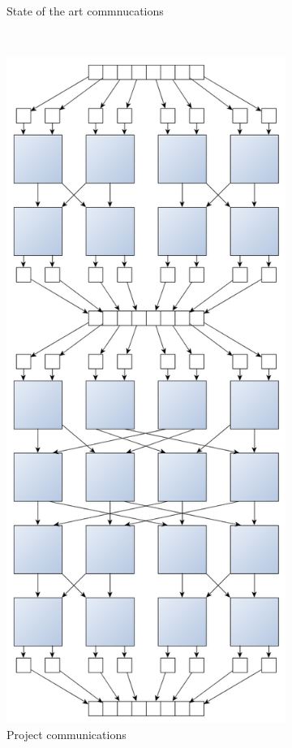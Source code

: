 \documentclass[a4paper,11pt]{article}
\begin{document}
\begin{figure}[h!]
\begin{subfigure}[b]{0.4\textwidth}
        \caption{State of the art commnucations}
        \label{fig:sato_comm}
    \end{subfigure}
    ~
    \begin{subfigure}[b]{0.4\textwidth}
        \centering
        \includegraphics[scale=0.15]{img/bitonic_sort_8.png}
        \caption{Project communications}
        \label{fig:impl_comm}
    \end{subfigure}
    \caption{}
    \label{}
  \end{figure}
\end{document}
